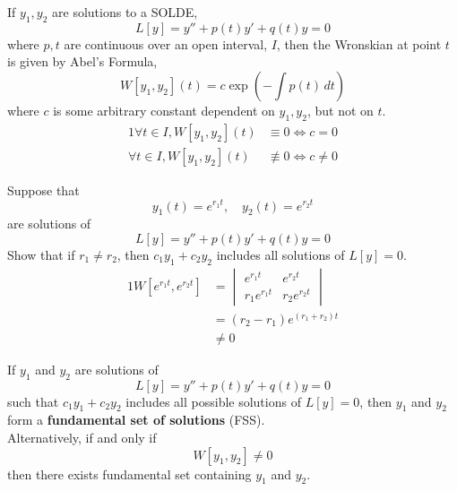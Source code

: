 \documentclass[diffeq.tex]{subfiles}
\begin{document}
    \begin{theorem}
        If $y_{1}, y_{2}$ are solutions to a SOLDE,
        \begin{equation}
            L[y] = y'' + p(t)y' + q(t)y = 0
        \end{equation}
        where $p, t$ are continuous over an open interval, $I$, then the Wronskian at point $t$ is given by Abel's Formula,
        \begin{equation}
            W[y_{1}, y_{2}](t) = c\exp\left(-\int p(t)\,dt\right)
        \end{equation}
        where $c$ is some arbitrary constant dependent on $y_{1}, y_{2}$, but not on $t$.
        \begin{alignat}{1}
            \forall t\in I, W[y_{1}, y_{2}](t) &\equiv 0 \iff c = 0\\
            \forall t\in I, W[y_{1}, y_{2}](t) &\nequiv 0 \iff c \neq 0
        \end{alignat}
    \end{theorem}
    \np
    \begin{example}
        Suppose that
        \begin{equation}
            y_{1}(t) = e^{r_{1}t},\quad y_{2}(t) = e^{r_{2}t}
        \end{equation}
        are solutions of
        \begin{equation}
            L[y] = y'' + p(t)y' + q(t)y = 0
        \end{equation}
        Show that if $r_{1} \neq r_{2}$, then $c_{1}y_{1} + c_{2}y_{2}$ includes all solutions of $L[y] = 0$.
        \begin{alignat}{1}
            W[e^{r_{1}t}, e^{r_{2}t}] &= \begin{vmatrix}
                e^{r_{1}t} & e^{r_{2}t}\\
                r_{1}e^{r_{1}t} & r_{2}e^{r_{2}t}
            \end{vmatrix}\\
            &= (r_{2} - r_{1})e^{(r_{1} + r_{2})t}\\
            &\neq 0
        \end{alignat}
    \end{example}
    \begin{definition}
        If $y_{1}$ and $y_{2}$ are solutions of
        \begin{equation}
            L[y] = y'' + p(t)y' + q(t)y = 0
        \end{equation}
        such that $c_{1}y_{1} + c_{2}y_{2}$ includes all possible solutions of $L[y] = 0$, then $y_{1}$ and $y_{2}$ form a \textbf{fundamental set of solutions} (FSS).\\
        Alternatively, if and only if
        \begin{equation}
            W[y_{1}, y_{2}] \neq 0
        \end{equation}
        then there exists fundamental set containing $y_{1}$ and $y_{2}$.
    \end{definition}
\end{document}
